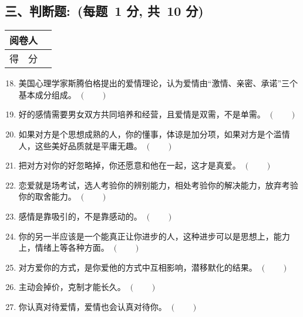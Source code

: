 \documentclass[twocolumn,landscape,UTF8]{ctexart}
\begin{document}
\begin{spacing}{1.3}
\section*{\hspace{4.5cm} 三、判断题:~(每题~1 分, 共~10 分)}
\vspace{-1cm}
\begin{tabular}{|p{}|p{}|}
\hline
\centering 阅卷人& \\
\hline
\centering 得~~分 &  \\
	\hline
\end{tabular}
\begin{enumerate}\setcounter{enumi}{17}
			
\item 美国心理学家斯腾伯格提出的爱情理论，认为爱情由“激情、亲密、承诺”三个基本成分组成。 \hfill$(~~~~~~~~)$

\item 好的感情需要男女双方共同培养和经营，且爱情是双需，不是单需。 \hfill $(~~~~~~~~)$

\item 如果对方是个思想成熟的人，你的懂事，体谅是加分项，如果对方是个滥情人，这些美好品质就是平庸无趣。 \hfill $(~~~~~~~~)$

\item 把对方对你的好忽略掉，你还愿意和他在一起，这才是真爱。 \hfill$(~~~~~~~~)$

\item 恋爱就是场考试，选人考验你的辨别能力，相处考验你的解决能力，放弃考验你的取舍能力。 \hfill$(~~~~~~~~)$

\item 感情是靠吸引的，不是靠感动的。 \hfill$(~~~~~~~~)$

\item 你的另一半应该是一个能真正让你进步的人，这种进步可以是思想上，能力上，情绪上等各种方面。 \hfill$(~~~~~~~~)$

\item 对方爱你的方式，是你爱他的方式中互相影响，潜移默化的结果。 \hfill$(~~~~~~~~)$

\item 主动会掉价，克制才能长久。 \hfill$(~~~~~~~~)$

\item 你认真对待爱情，爱情也会认真对待你。 \hfill $(~~~~~~~~)$
	
\end{enumerate}


\end{spacing}
\end{document}
